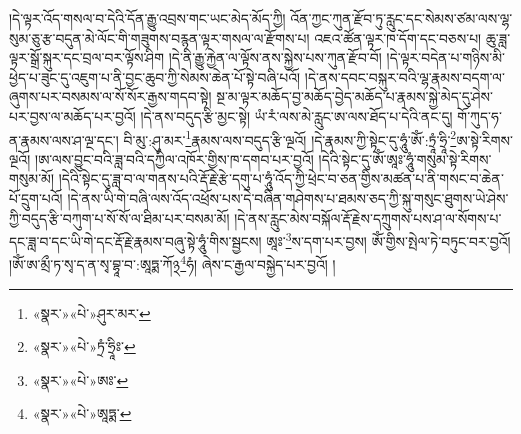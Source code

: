 །དེ་ལྟར་འོད་གསལ་བ་དེའི་དོན་རྒྱུ་འབྲས་གང་ཡང་མེད་མོད་ཀྱི། འོན་ཀྱང་ཀུན་རྫོབ་ཏུ་རླུང་དང་སེམས་ཙམ་ལས་ལྷ་སུམ་ཅུ་རྩ་བདུན་མེ་ལོང་གི་གཟུགས་བརྙན་ལྟར་གསལ་ལ་རྫོགས་པ། འཇའ་ཚོན་ལྟར་ཁ་དོག་དང་བཅས་པ། ཆུ་ཟླ་ལྟར་སྒྲོ་སྐུར་དང་བྲལ་བར་ལྟོས་ཤིག །དེ་ནི་རྒྱུ་རྐྱེན་ལ་ལྟོས་ནས་སྐྱེས་པས་ཀུན་རྫོབ་བོ། །དེ་ལྟར་བདེན་པ་གཉིས་མི་ཕྱེད་པ་ཟུང་དུ་འཇུག་པ་ནི་བྱང་ཆུབ་ཀྱི་སེམས་ཆེན་པོ་སྟེ་བཞི་པའོ། །དེ་ནས་དབང་བསྐུར་བའི་ལྷ་རྣམས་བདག་ལ་ཞུགས་པར་བསམས་ལ་སོ་སོར་རྒྱས་གདབ་སྟེ། སྔ་མ་ལྟར་མཆོད་བྱ་མཆོད་བྱེད་མཆོད་པ་རྣམས་སྐྱེ་མེད་དུ་ཤེས་པར་བྱས་ལ་མཆོད་པར་བྱའོ། །དེ་ནས་བདུད་རྩི་མྱང་སྟེ། ཡཾ་རཾ་ལས་མེ་རླུང་ཨ་ལས་ཐོད་པ་དེའི་ནང་དུ། གོ་ཀུད་ཧ་ན་རྣམས་ལས་ཤ་ལྔ་དང་། བི་མུ་:ཤུ་མར་\footnote{«སྣར་»«པེ་»ཤུར་མར་}རྣམས་ལས་བདུད་རྩི་ལྔའོ། །དེ་རྣམས་ཀྱི་སྟེང་དུ་ཧཱུཾ་ཨོཾ་:ཏྲཱཾ་ཧྲཱི་\footnote{«སྣར་»«པེ་»ཏྲཾ་ཧྲཱིཿ་}ཨ་སྟེ་རིགས་ལྔའོ། །ཨ་ལས་བྱུང་བའི་ཟླ་བའི་དཀྱིལ་འཁོར་གྱིས་ཁ་དགབ་པར་བྱའོ། །དེའི་སྟེང་དུ་ཨོཾ་ཨཱཿ་ཧཱུཾ་གསུམ་སྟེ་རིགས་གསུམ་མོ། །དེའི་སྟེང་དུ་ཟླ་བ་ལ་གནས་པའི་རྡོ་རྗེ་རྩེ་དགུ་པ་ཧཱུཾ་འོད་ཀྱི་ཕྲེང་བ་ཅན་གྱིས་མཚན་པ་ནི་གསང་བ་ཆེན་པོ་དྲུག་པའོ། །དེ་ནས་ཡི་གེ་བཞི་ལས་འོད་འཕྲོས་པས་དེ་བཞིན་གཤེགས་པ་ཐམས་ཅད་ཀྱི་སྐུ་གསུང་ཐུགས་ཡེ་ཤེས་ཀྱི་བདུད་རྩི་བཀུག་པ་སོ་སོ་ལ་ཐིམ་པར་བསམ་མོ། །དེ་ནས་རླུང་མེས་བསྐོལ་རྡོ་རྗེས་དཀྲུགས་པས་ཤ་ལ་སོགས་པ་དང་ཟླ་བ་དང་ཡི་གེ་དང་རྡོ་རྗེ་རྣམས་བཞུ་སྟེ་ཧཱུཾ་གིས་སྦྱངས། ཨཱཿ་\footnote{«སྣར་»«པེ་»ཨཿ་}ས་དག་པར་བྱས། ཨོཾ་གྱིས་སྤེལ་ཏེ་བཏུང་བར་བྱའོ། །ཨོཾ་ཨ་མྲྀ་ཏ་སྭ་ད་ན་སྭ་བྷཱ་བ་:ཨཱཏྨ་ཀོ྅\footnote{«སྣར་»«པེ་»ཨཱཏྨ་}ཧཾ། ཞེས་ང་རྒྱལ་བསྐྱེད་པར་བྱའོ། །
